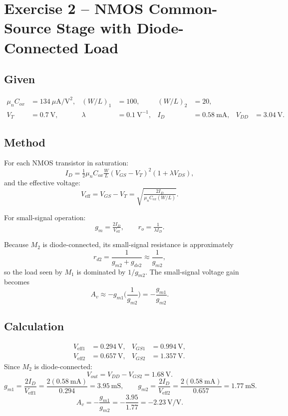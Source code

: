 \documentclass[main.tex]{subfiles}
\begin{document}
\section{Exercise 2 – NMOS Common-Source Stage with Diode-Connected Load}

\subsection*{Given}
\[
\begin{aligned}
\mu_n C_{ox} &= 134~\mu\text{A/V}^2, &
(W/L)_1 &= 100, &
(W/L)_2 &= 20,\\
V_T &= 0.7~\text{V}, &
\lambda &= 0.1~\text{V}^{-1}, &
I_D &= 0.58~\text{mA}, &
V_{DD} &= 3.04~\text{V}.
\end{aligned}
\]

\subsection*{Method}
For each NMOS transistor in saturation:
\begin{equation}
I_D = \tfrac{1}{2}\mu_n C_{ox}\tfrac{W}{L}(V_{GS}-V_T)^2(1+\lambda V_{DS}),
\label{eq:2.1}
\end{equation}
and the effective voltage:
\begin{equation}
V_{\text{eff}} = V_{GS}-V_T = \sqrt{\tfrac{2I_D}{\mu_n C_{ox}(W/L)}}.
\label{eq:2.2}
\end{equation}

For small-signal operation:
\begin{equation}
g_m=\tfrac{2I_D}{V_{\text{eff}}}, \qquad
r_o=\tfrac{1}{\lambda I_D}.
\label{eq:2.3}
\end{equation}

Because \(M_2\) is diode-connected, its small-signal resistance is approximately
\[
r_{d2}=\frac{1}{g_{m2}+g_{ds2}}\approx\frac{1}{g_{m2}},
\]
so the load seen by \(M_1\) is dominated by \(1/g_{m2}\).
The small-signal voltage gain becomes
\begin{equation}
A_v \approx -g_{m1}\Big(\frac{1}{g_{m2}}\Big) = -\frac{g_{m1}}{g_{m2}}.
\label{eq:2.4}
\end{equation}

\subsection*{Calculation}
\[
\begin{aligned}
V_{\text{eff1}} &= 0.294~\text{V}, & V_{GS1}&=0.994~\text{V},\\
V_{\text{eff2}} &= 0.657~\text{V}, & V_{GS2}&=1.357~\text{V}.
\end{aligned}
\]
Since \(M_2\) is diode-connected:
\[
V_{out}=V_{DD}-V_{GS2}=1.68~\text{V}.
\]
\[
g_{m1}=\frac{2I_D}{V_{\text{eff1}}}=\frac{2(0.58~\text{mA})}{0.294}=3.95~\text{mS},\qquad
g_{m2}=\frac{2I_D}{V_{\text{eff2}}}=\frac{2(0.58~\text{mA})}{0.657}=1.77~\text{mS}.
\]
\[
\boxed{A_v = -\frac{g_{m1}}{g_{m2}} = -\frac{3.95}{1.77} = -2.23~\text{V/V}.}
\]
\end{document}
